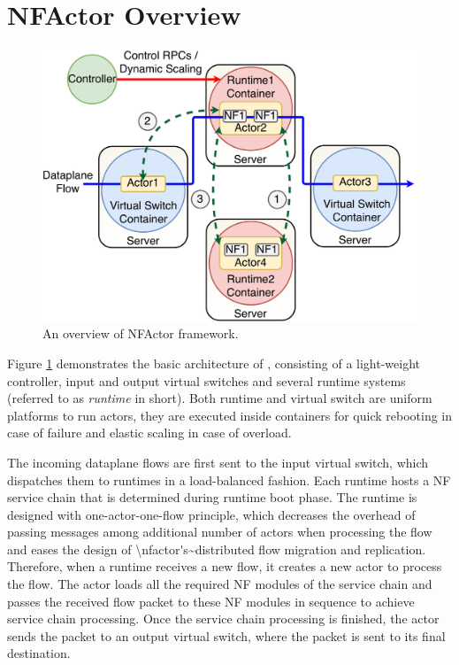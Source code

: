 \section {NFActor Overview}

\begin{figure}[!t]
  \centering
  \includegraphics[width=\columnwidth]{figure/final-final-nfactor-cluster.pdf}
  \caption{An overview of NFActor framework.}
  \label{fig:runtime}
\end{figure}

Figure \ref{fig:runtime} demonstrates the basic architecture of \nfactor, consisting of a light-weight controller, input and output virtual switches and several runtime systems (referred to as \textit{runtime} in short). \ac{Both runtime and virtual switch are uniform platforms to run actors, they are executed inside containers for quick rebooting in case of failure and elastic scaling in case of overload.} 


The incoming dataplane flows are first sent to the input virtual switch, which dispatches them to runtimes in a load-balanced fashion. \ac{Each runtime hosts a NF service chain that is determined during runtime boot phase. The runtime is designed with one-actor-one-flow principle, which decreases the overhead of passing messages among additional number of actors when processing the flow and eases the design of \nfactor's~distributed flow migration and replication.}   Therefore, when a runtime receives a new flow, it creates a new actor to process the flow. The actor loads all the required NF modules of the service chain and passes the received flow packet to these NF modules in sequence to achieve service chain processing. Once the service chain processing is finished, the actor sends the packet to an output virtual switch, where the packet is sent to its final destination.


